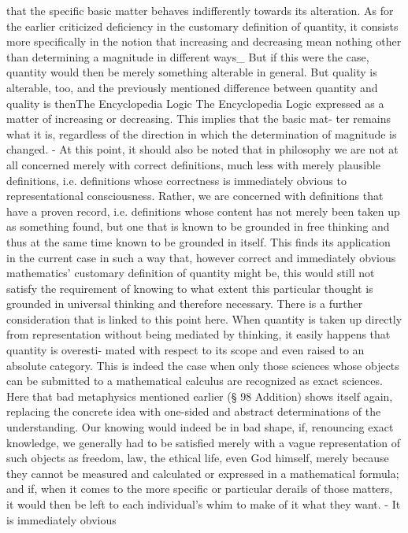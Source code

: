 that the specific basic matter behaves indifferently towards its alteration. As for
the earlier criticized deficiency in the customary definition of quantity, it consists
more specifically in the notion that increasing and decreasing mean nothing other
than determining a magnitude in different ways_ But if this were the case, quantity
would then be merely something alterable in general. But quality is alterable, too,
and the previously mentioned difference between quantity and quality is thenThe Encyclopedia Logic The Encyclopedia Logic
expressed as a matter of increasing or decreasing. This implies that the basic mat-
ter remains what it is, regardless of the direction in which the determination of
magnitude is changed. - At this point, it should also be noted that in philosophy
we are not at all concerned merely with correct definitions, much less with merely
plausible definitions, i.e. definitions whose correctness is immediately obvious to
representational consciousness. Rather, we are concerned with definitions that
have a proven record, i.e. definitions whose content has not merely been taken up
as something found, but one that is known to be grounded in free thinking and
thus at the same time known to be grounded in itself. This finds its application
in the current case in such a way that, however correct and immediately obvious
mathematics' customary definition of quantity might be, this would still not satisfy
the requirement of knowing to what extent this particular thought is grounded in
universal thinking and therefore necessary. There is a further consideration that is
linked to this point here. When quantity is taken up directly from representation
without being mediated by thinking, it easily happens that quantity is overesti-
mated with respect to its scope and even raised to an absolute category. This is
indeed the case when only those sciences whose objects can be submitted to a
mathematical calculus are recognized as exact sciences. Here that bad metaphysics
mentioned earlier (§ 98 Addition) shows itself again, replacing the concrete idea
with one-sided and abstract determinations of the understanding. Our knowing
would indeed be in bad shape, if, renouncing exact knowledge, we generally had
to be satisfied merely with a vague representation of such objects as freedom,
law, the ethical life, even God himself, merely because they cannot be measured
and calculated or expressed in a mathematical formula; and if, when it comes to
the more specific or particular derails of those matters, it would then be left to
each individual's whim to make of it what they want. - It is immediately obvious
